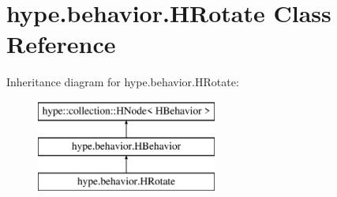 \hypertarget{classhype_1_1behavior_1_1_h_rotate}{\section{hype.\-behavior.\-H\-Rotate Class Reference}
\label{classhype_1_1behavior_1_1_h_rotate}
}
Inheritance diagram for hype.\-behavior.\-H\-Rotate\-:\begin{figure}[H]
\begin{center}
\leavevmode
\includegraphics[height=3.000000cm]{classhype_1_1behavior_1_1_h_rotate}
\end{center}
\end{figure}
